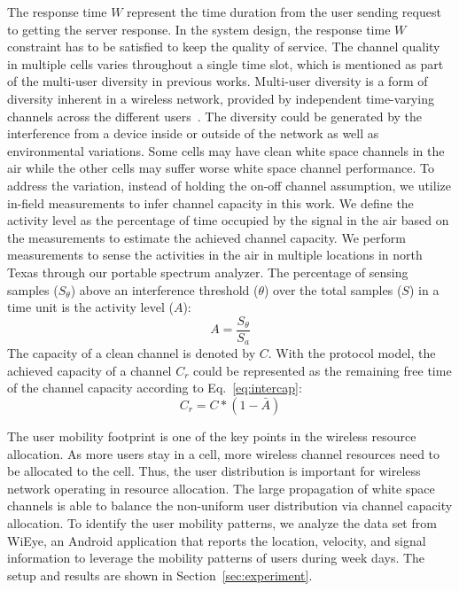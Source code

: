 The response time $W$ represent the time duration from the user sending request to getting the 
server response. 
In the system design, the response time $W$ constraint has to be satisfied to 
keep the quality of service. 
The channel quality in multiple cells varies throughout a single time slot, which is mentioned as part 
of the multi-user diversity in previous works. Multi-user diversity is a form of diversity 
inherent in a wireless network, provided by independent time-varying channels across the different 
users~\cite{viswanath2002opportunistic}. 
The diversity could be generated by the interference from a device inside or outside of the network as well as environmental variations.  
Some cells may have clean white space channels in the air while the other cells may suffer 
worse white space channel performance. 
To address the variation, instead of holding the on-off channel assumption, we utilize in-field 
measurements to infer channel capacity in this work.
We define the activity level as the percentage of time occupied by the signal in the air based on the 
measurements to estimate the achieved channel capacity. 
We perform measurements to sense the activities in the air in multiple locations in north Texas 
through our portable spectrum analyzer.
The percentage of sensing samples ($S_\theta$) above an interference threshold ($\theta$) over the 
total samples ($S$) in a time unit is the activity level ($A$):
\begin{equation}
\label{eq:actdef}
A=\frac{S_\theta}{S_a}
\end{equation}
The capacity of a clean channel is denoted by $C$. With the protocol model, the achieved capacity 
of a channel $C_r$ could be represented as the remaining free time of the channel capacity 
according to Eq.~\ref{eq:intercap}: 
\begin{equation}
\label{eq:intercap}
C_r=C*(1-\bar{A})
\end{equation}

The user mobility footprint is one of the key points in the wireless resource allocation. 
As more users stay in a cell, more wireless channel resources need to be allocated to the 
cell.
Thus, the user distribution is important for wireless network operating in resource allocation. 
The large propagation of white space channels is able to balance the non-uniform user distribution via 
channel capacity allocation.
To identify the user mobility patterns, we analyze the data set from WiEye, an Android application that 
reports the location, velocity, and signal information to leverage the mobility patterns of users during week days. The setup and results are shown in 
Section~\ref{sec:experiment}.

